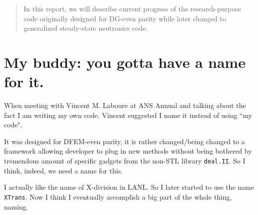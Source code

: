 \documentclass[letterpaper,11pt]{texMemo}
\begin{document}
\memodate{\today}
\maketitle



%



\begin{abstract}
	In this report, we will describe current progress of the research-purpose code originally designed for DG-even parity while later changed to generalized steady-state neutronics code.
\end{abstract}


\section{My buddy: you gotta have a name for it.}
{
	When meeting with Vincent M. Laboure at ANS Annual and talking about the fact I am writing my own code, Vincent suggested I name it instead of using ``my code".
	
	It was designed for DFEM-even parity, it is rather changed/being changed to a framework allowing developer to plug in new methods without being bothered by tremendous amount of specific gadgets from the non-STL library {\tt deal.II}. So I think, indeed, we need a name for this.
	
	I actually like the name of X-division in LANL. So I later started to use the name {\tt XTrans}. Now I think I eventually accomplish a big part of the whole thing, naming.
}
\end{document}
